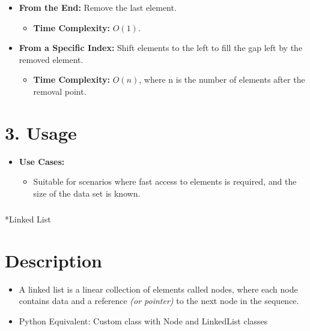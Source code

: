 \documentclass[
  letterpaper,
  DIV=11,
  numbers=noendperiod]{scrreprt}
\makeatletter
\let\oldsubparagraph\subparagraph
\renewcommand{\subparagraph}{
    \@ifstar
      \xxxSubParagraphStar
      \xxxSubParagraphNoStar
  }
\newcommand{\xxxSubParagraphStar}[1]{\oldsubparagraph*{#1}\mbox{}}
\newcommand{\xxxSubParagraphNoStar}[1]{\oldsubparagraph{#1}\mbox{}}
\providecommand{\tightlist}{%
  \setlength{\itemsep}{0pt}\setlength{\parskip}{0pt}}
\makeatother
\begin{document}
\begin{itemize}
  \begin{itemize}
  \tightlist
  \item
    \textbf{From the End:} Remove the last element.

    \begin{itemize}
    \tightlist
    \item
      \textbf{Time Complexity:} \(O(1)\).
    \end{itemize}
  \item
    \textbf{From a Specific Index:} Shift elements to the left to fill
    the gap left by the removed element.

    \begin{itemize}
    \tightlist
    \item
      \textbf{Time Complexity:} \(O(n)\), where n is the number of
      elements after the removal point.
    \end{itemize}
  \end{itemize}
\end{itemize}

\section{3. Usage}

\begin{itemize}
\item
  \textbf{Use Cases:}

  \begin{itemize}
  \tightlist
  \item
    Suitable for scenarios where fast access to elements is required,
    and the size of the data set is known.
  \end{itemize}
\end{itemize}

\subparagraph*{Linked List}\label{linked-list}

\section{Description}

\begin{itemize}
\tightlist
\item
  A linked list is a linear collection of elements called nodes, where
  each node contains data and a reference \emph{(or pointer)} to the
  next node in the sequence.
\item
  Python Equivalent: Custom class with Node and LinkedList classes
\end{itemize}
\end{document}
